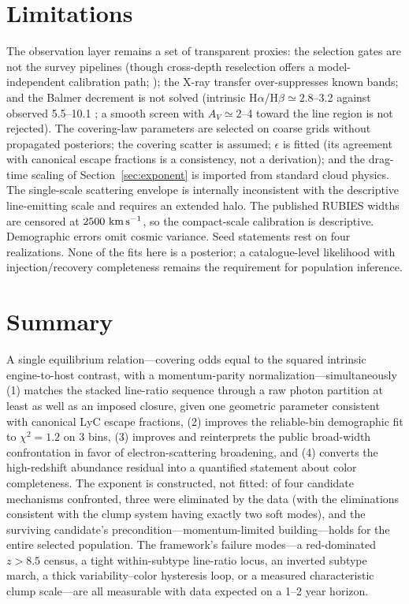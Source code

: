 \documentclass[twocolumn]{aastex631}
\begin{document}
\section{Limitations}\label{sec:limits}
The observation layer remains a set of transparent proxies: the selection
gates are not the survey pipelines (though cross-depth reselection offers
a model-independent calibration path; \citealt{PandevXDC}); the X-ray
transfer over-suppresses
known bands; and the Balmer decrement is not solved (intrinsic
H$\alpha$/H$\beta\simeq2.8$--3.2 against observed 5.5--10.1
\citep{PerezGonzalez2026}; a smooth screen with $A_{V}\simeq2$--4 toward
the line region is not rejected). The covering-law parameters are
selected on coarse grids without propagated posteriors; the covering
scatter is assumed; $\epsilon$ is fitted (its agreement with canonical
escape fractions is a consistency, not a derivation); and the drag-time
scaling of Section~\ref{sec:exponent} is imported from standard cloud
physics. The single-scale scattering envelope is internally inconsistent
with the descriptive line-emitting scale and requires an extended halo.
The published RUBIES widths are censored at $2500~{\rm km\,s^{-1}}$, so
the compact-scale calibration is descriptive. Demographic errors omit
cosmic variance. Seed statements rest on four realizations. None of the
fits here is a posterior; a catalogue-level likelihood with
injection/recovery completeness remains the requirement for population
inference.

\section{Summary}\label{sec:summary}
A single equilibrium relation---covering odds equal to the squared
intrinsic engine-to-host contrast, with a momentum-parity
normalization---simultaneously (1) matches the stacked line-ratio
sequence through a raw photon partition at least as well as an imposed
closure, given one geometric parameter consistent with canonical LyC
escape fractions, (2) improves the reliable-bin demographic fit to
$\chi^{2}=1.2$ on 3 bins, (3) improves and reinterprets the public
broad-width confrontation in favor of electron-scattering broadening, and
(4) converts the high-redshift abundance residual into a quantified
statement about color completeness. The exponent is constructed, not
fitted: of four candidate mechanisms confronted, three were eliminated by
the data (with the eliminations consistent with the clump system having
exactly two soft modes), and the surviving candidate's
precondition---momentum-limited building---holds for the entire selected
population. The framework's failure modes---a red-dominated $z>8.5$
census, a tight within-subtype line-ratio locus, an inverted subtype
march, a thick variability--color hysteresis loop, or a measured
characteristic clump scale---are all measurable with data expected on a
1--2 year horizon.
\end{document}
